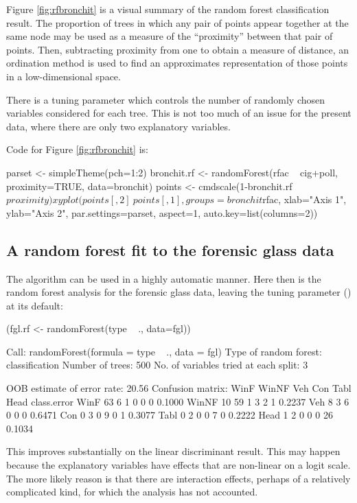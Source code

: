 Figure \ref{fig:rfbronchit} is a visual summary of the random forest
classification result.  The proportion of trees in which any pair of
points appear together at the same node may be used as a measure of
the ``proximity'' between that pair of points.  Then, subtracting
proximity from one to obtain a measure of distance, an ordination
method is used to find an approximates representation of those points in a
low-dimensional space.

There is a tuning parameter  which controls the number of
randomly chosen variables considered for each tree.  This is not too
much of an issue for the present data, where there are only two
explanatory variables.

Code for Figure \ref{fig:rfbronchit} is:
\begin{Schunk}
\begin{Sinput}
parset <- simpleTheme(pch=1:2)
bronchit.rf <- randomForest(rfac ~ cig+poll,
                            proximity=TRUE,
                            data=bronchit)
points <- cmdscale(1-bronchit.rf$proximity)
xyplot(points[,2] ~ points[,1],
       groups=bronchit$rfac,
       xlab="Axis 1", ylab="Axis 2",
       par.settings=parset, aspect=1,
       auto.key=list(columns=2))
\end{Sinput}
\end{Schunk}

\subsection*{A random forest fit to the forensic glass data}

The algorithm can be used in a highly automatic manner.  Here then is
the random forest analysis for the forensic glass data, leaving the
tuning parameter () at its default:
\begin{Schunk}
\begin{Sinput}
(fgl.rf <- randomForest(type ~ ., data=fgl))
\end{Sinput}
\begin{Soutput}

Call:
 randomForest(formula = type ~ ., data = fgl) 
               Type of random forest: classification
                     Number of trees: 500
No. of variables tried at each split: 3

        OOB estimate of  error rate: 20.56%
Confusion matrix:
      WinF WinNF Veh Con Tabl Head class.error
WinF    63     6   1   0    0    0      0.1000
WinNF   10    59   1   3    2    1      0.2237
Veh      8     3   6   0    0    0      0.6471
Con      0     3   0   9    0    1      0.3077
Tabl     0     2   0   0    7    0      0.2222
Head     1     2   0   0    0   26      0.1034
\end{Soutput}
\end{Schunk}
This improves substantially on the linear discriminant result.
This may happen because the explanatory variables have effects
that are non-linear on a logit scale.  The more likely reason
is that there are interaction effects, perhaps of a relatively
complicated kind, for which the  analysis has not
accounted.

